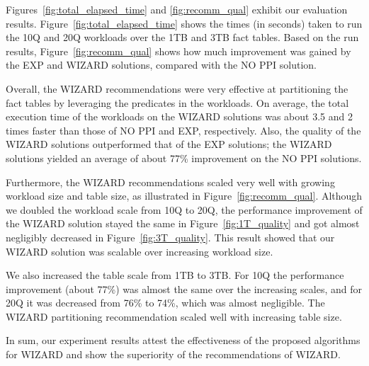 \documentclass[runningheads]{comsis2}
\begin{document}

Figures~\ref{fig:total_elapsed_time} and \ref{fig:recomm_qual} exhibit our evaluation results.
Figure~\ref{fig:total_elapsed_time} shows the times (in seconds) taken 
to run the 10Q and 20Q workloads over the 1TB and 3TB fact tables. 
Based on the run results, Figure~\ref{fig:recomm_qual} shows 
how much improvement was gained by the EXP and WIZARD solutions, compared with the NO PPI solution. 

Overall, the WIZARD recommendations were very effective at partitioning 
the fact tables by leveraging the predicates in the workloads. 
On average, the \hbox{total} execution time of the workloads on the WIZARD solutions was 
about 3.5 and 2 times faster than those of NO PPI and EXP, respectively. 
Also, the quality of the \hbox{WIZARD} solutions outperformed that of the EXP solutions; 
the WIZARD solutions yielded an average of about 77\% improvement on the NO PPI solutions.  

Furthermore, the WIZARD recommendations 
scaled very well with growing workload size and table size, 
as illustrated in Figure~\ref{fig:recomm_qual}. 
Although we doubled the workload scale from 10Q to 20Q, 
the performance improvement of the WIZARD solution stayed the same in Figure~\ref{fig:1T_quality} 
and got almost negligibly decreased in Figure~\ref{fig:3T_quality}. 
This result showed that our WIZARD \hbox{solution} was scalable over increasing workload size.

We also increased the table scale from 1TB to 3TB. 
For 10Q the performance improvement (about 77\%) was almost the same over the increasing scales, 
and for 20Q it was decreased from 76\% to 74\%, which was \hbox{almost} negligible.
The WIZARD partitioning \hbox{recommendation} scaled well with increasing table size.

In sum, our experiment results attest the effectiveness of the proposed algorithms for WIZARD 
and show the superiority of the recommendations of WIZARD.

\end{document}
